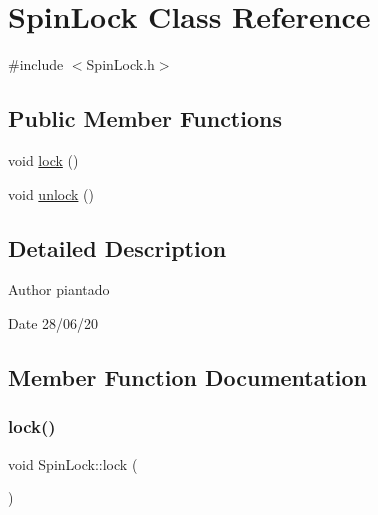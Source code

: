\hypertarget{class_spin_lock}{}\section{Spin\+Lock Class Reference}
\label{class_spin_lock}


{\ttfamily \#include $<$Spin\+Lock.\+h$>$}

\subsection*{Public Member Functions}
\begin{DoxyCompactItemize}
\item 
void \hyperlink{class_spin_lock_a2db046cb75c8febd532923ce36c4c3ad}{lock} ()
\item 
void \hyperlink{class_spin_lock_a25ef6814d1e3fbd621db947ae7522d0e}{unlock} ()
\end{DoxyCompactItemize}


\subsection{Detailed Description}
\begin{DoxyAuthor}{Author}
piantado 
\end{DoxyAuthor}
\begin{DoxyDate}{Date}
28/06/20 
\end{DoxyDate}


\subsection{Member Function Documentation}
\mbox{\label{class_spin_lock_a2db046cb75c8febd532923ce36c4c3ad}} 
\subsubsection{\texorpdfstring{lock()}{lock()}}
{\footnotesize\ttfamily void Spin\+Lock\+::lock (\begin{DoxyParamCaption}{ }\end{DoxyParamCaption})\hspace{0.3cm}{\ttfamily [inline]}}

\mbox{\label{class_spin_lock_a25ef6814d1e3fbd621db947ae7522d0e}} 
